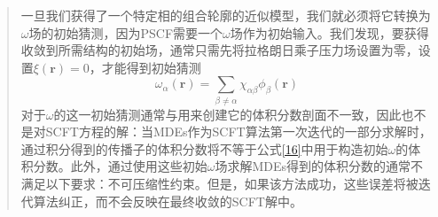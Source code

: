 \documentclass{article}
\begin{document}
\begin{CJK}{UTF8}{gkai}
\begin{quotation}
一旦我们获得了一个特定相的组合轮廓的近似模型，我们就必须将它转换为$\omega$场的初始猜测，因为PSCF需要一个$\omega$场作为初始输入。我们发现，要获得收敛到所需结构的初始场，通常只需先将拉格朗日乘子压力场设置为零，设置$\xi(\mathbf{r})=0$，才能得到初始猜测
\begin{equation}\label{16}
\omega _{\alpha}(\mathbf{r})=\sum _{\beta \neq \alpha} \chi _{\alpha \beta} \phi _{\beta}(\mathbf{r})
\end{equation}
对于$\omega$的这一初始猜测通常与用来创建它的体积分数剖面不一致，因此也不是对SCFT方程的解：当MDEs作为SCFT算法第一次迭代的一部分求解时，通过积分得到的传播子的体积分数将不等于公式\ref{16}中用于构造初始$\omega$的体积分数。此外，通过使用这些初始$\omega$场求解MDEs得到的体积分数的通常不满足以下要求：不可压缩性约束。但是，如果该方法成功，这些误差将被迭代算法纠正，而不会反映在最终收敛的SCFT解中。


\end{quotation}
\end{CJK}
\end{document}
